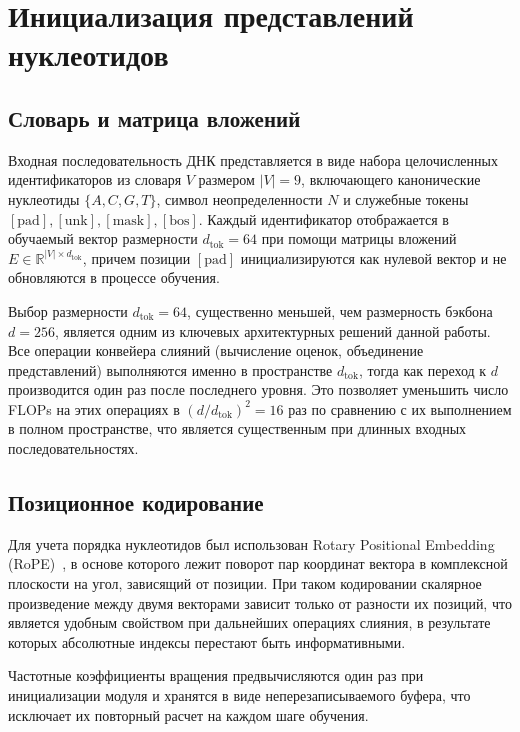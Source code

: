 \section{Инициализация представлений нуклеотидов}

\subsection{Словарь и матрица вложений}

Входная последовательность ДНК представляется в виде набора
целочисленных идентификаторов из словаря $V$ размером $|V| = 9$,
включающего канонические нуклеотиды $\{A, C, G, T\}$, символ
неопределенности $N$ и служебные токены $[\text{pad}], [\text{unk}],
[\text{mask}], [\text{bos}]$. Каждый идентификатор отображается в
обучаемый вектор размерности $d_{\text{tok}} = 64$ при помощи матрицы
вложений $E \in \mathbb{R}^{|V| \times d_{\text{tok}}}$, причем
позиции $[\text{pad}]$ инициализируются как нулевой вектор и не
обновляются в процессе обучения.

Выбор размерности $d_{\text{tok}} = 64$, существенно меньшей, чем
размерность бэкбона $d = 256$, является одним из ключевых
архитектурных решений данной работы. Все операции конвейера слияний
(вычисление оценок, объединение представлений) выполняются именно в
пространстве $d_{\text{tok}}$, тогда как переход к $d$ производится
один раз после последнего уровня. Это позволяет уменьшить число FLOPs
на этих операциях в $(d/d_{\text{tok}})^2 = 16$ раз по сравнению с их
выполнением в полном пространстве, что является существенным при
длинных входных последовательностях.

\subsection{Позиционное кодирование}

Для учета порядка нуклеотидов был использован Rotary Positional
Embedding (RoPE)~\cite{suRoFormerEnhancedTransformer2021}, в основе
которого лежит поворот пар координат вектора в комплексной плоскости
на угол, зависящий от позиции. При таком кодировании скалярное
произведение между двумя векторами зависит только от разности их
позиций, что является удобным свойством при дальнейших операциях
слияния, в результате которых абсолютные индексы перестают быть
информативными.

Частотные коэффициенты вращения предвычисляются один раз при
инициализации модуля и хранятся в виде неперезаписываемого буфера, что
исключает их повторный расчет на каждом шаге обучения.

